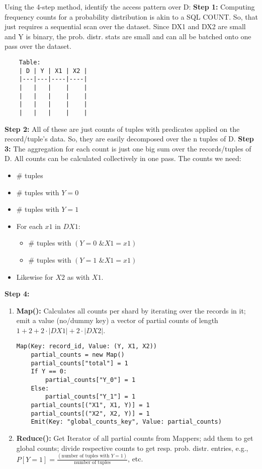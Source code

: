\documentclass{article}
\begin{document}
\begin{enumerate}[label=\textbf{Question \arabic*.}]
  Using the 4-step method, identify the access pattern over D:
  \textbf{Step 1:} Computing frequency counts for a probability distribution is akin to a SQL COUNT. So, that just requires a sequential scan over the dataset. Since DX1 and DX2 are small and Y is binary, the prob. distr. stats are small and can all be batched onto one pass over the dataset.
    \begin{verbatim}
    Table:
    | D | Y | X1 | X2 |
    |---|---|----|----|
    |   |   |    |    |
    |   |   |    |    |
    |   |   |    |    |
    |   |   |    |    |
    \end{verbatim}
  \textbf{Step 2:} All of these are just counts of tuples with predicates applied on the record/tuple's data. So, they are easily decomposed over the n tuples of D.
  \textbf{Step 3:} The aggregation for each count is just one big sum over the records/tuples of D. All counts can be calculated collectively in one pass.
    The counts we need:
    \begin{itemize}
        \item \# tuples
        \item \# tuples with $Y = 0$
        \item \# tuples with $Y = 1$
        \item For each $x1$ in $DX1$:
        \begin{itemize}
            \item \# tuples with $(Y = 0 \text{ \& } X1 = x1)$
            \item \# tuples with $(Y = 1 \text{ \& } X1 = x1)$
        \end{itemize}
        \item Likewise for $X2$ as with $X1$.
    \end{itemize}
  \textbf{Step 4:}
    \begin{enumerate}[label=(\alph*)]
    \item \textbf{Map():} Calculates all counts per shard by iterating over the records in it; emit a value (no/dummy key) a vector of partial counts of length $1+2+2\cdot|DX1|+2\cdot|DX2|$.
        \begin{lstlisting}
Map(Key: record_id, Value: (Y, X1, X2))
    partial_counts = new Map()
    partial_counts["total"] = 1
    If Y == 0:
        partial_counts["Y_0"] = 1
    Else:
        partial_counts["Y_1"] = 1
    partial_counts[("X1", X1, Y)] = 1
    partial_counts[("X2", X2, Y)] = 1
    Emit(Key: "global_counts_key", Value: partial_counts)
        \end{lstlisting}
    \item \textbf{Reduce():} Get Iterator of all partial counts from Mappers; add them to get global counts; divide respective counts to get resp. prob. distr. entries, e.g., $P[Y=1] = \frac{(\text{number of tuples with } Y=1)}{\text{number of tuples}}$, etc.

\end{enumerate}
\end{enumerate}
\end{document}

